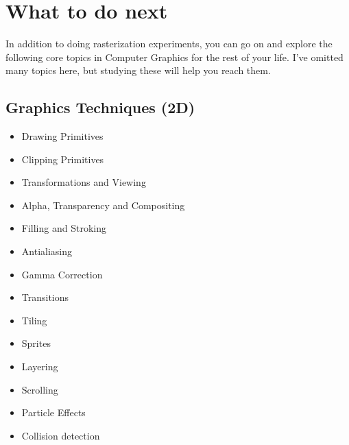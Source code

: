 \chapter{What to do next}
In addition to doing rasterization experiments, you can go on and explore the following core topics in Computer Graphics for the rest of your life. I’ve omitted many topics here, but studying these will help you reach them.

\section{Graphics Techniques (2D)}
\begin{itemize}
    \item Drawing Primitives
    \item Clipping Primitives
    \item Transformations and Viewing
    \item Alpha, Transparency and Compositing
    \item Filling and Stroking
    \item Antialiasing
    \item Gamma Correction
    \item Transitions
    \item Tiling
    \item Sprites
    \item Layering
    \item Scrolling
    \item Particle Effects
    \item Collision detection
\end{itemize}

